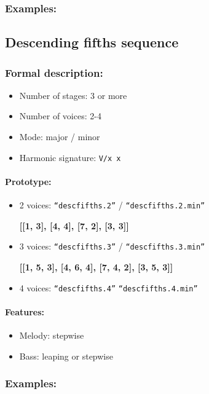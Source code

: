 \documentclass[11pt, openany]{article}
\begin{document}
\subsubsection{Examples:}


	\subsection{Descending fifths sequence}
	
\subsubsection{Formal description:}
\begin{itemize}
\item Number of stages: 3 or more
\item Number of voices: 2-4
\item Mode: major / minor
\item Harmonic signature: \texttt{V/x x}
\end{itemize}

\paragraph{Prototype:}
\begin{itemize}
\item 2 voices: \texttt{“descfifths.2”} / \texttt{“descfifths.2.min”}
	\begin{center}
    \textbf{[[1, 3], [4, 4], [7, 2], [3, 3]]}
    \end{center}
\item 3 voices: \texttt{“descfifths.3”} / \texttt{“descfifths.3.min”}
	\begin{center}
    \textbf{[[1, 5, 3], [4, 6, 4], [7, 4, 2], [3, 5, 3]]}
    \end{center}
\item 4 voices: \texttt{“descfifths.4”} \texttt{“descfifths.4.min”}
\end{itemize}

\paragraph{Features:}
\begin{itemize}
\item Melody: stepwise
\item Bass: leaping or stepwise
\end{itemize}

\subsubsection{Examples:}
\end{document}

